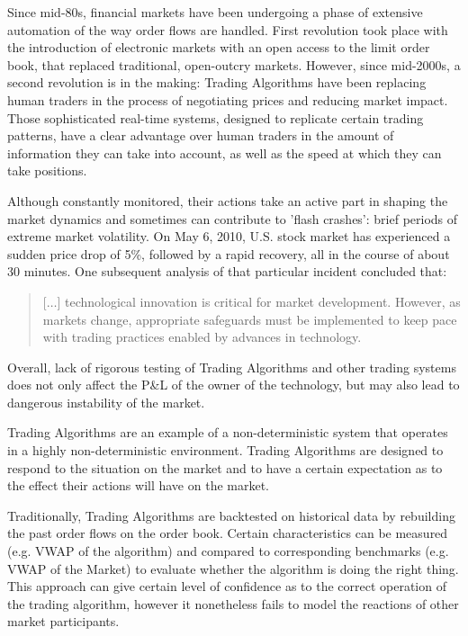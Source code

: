 Since mid-80s, financial markets have been undergoing a phase of extensive automation of the way order flows are handled. First revolution took place with the introduction of electronic markets with an open access to the limit order book, that replaced traditional, open-outcry markets. However, since mid-2000s, a second revolution is in the making: Trading Algorithms have been replacing human traders in the process of negotiating prices and reducing market impact. Those sophisticated real-time systems, designed to replicate certain trading patterns, have a clear advantage over human traders in the amount of information they can take into account, as well as the speed at which they can take positions. \cite{Lenglet}

Although constantly monitored, their actions take an active part in shaping the market dynamics and sometimes can contribute to 'flash crashes': brief periods of extreme market volatility. On May 6, 2010, U.S. stock market has experienced a sudden price drop of 5\%, followed by a rapid recovery, all in the course of about 30 minutes. One subsequent analysis of that particular incident concluded that:
\begin{quote}
[$\ldots$] technological innovation is critical for market development. However, as markets change, appropriate safeguards must be implemented to keep pace with trading practices enabled by advances in technology.\cite{Kirilenko2011}
\end{quote}
Overall, lack of rigorous testing of Trading Algorithms and other trading systems does not only affect the P\&L  of the owner of the technology, but may also lead to dangerous instability of the market.

Trading Algorithms are an example of a non-deterministic system that operates in a highly non-deterministic environment. Trading Algorithms are designed to respond to the situation on the market and to have a certain expectation as to the effect their actions will have on the market.

Traditionally, Trading Algorithms are backtested on historical data by rebuilding the past order flows on the order book. Certain characteristics can be measured (e.g. VWAP of the algorithm) and compared to corresponding benchmarks (e.g. VWAP of the Market) to evaluate whether the algorithm is doing the right thing. This approach can give certain level of confidence as to the correct operation of the trading algorithm, however it nonetheless fails to model the reactions of other market participants. \cite{Coggins2006}

